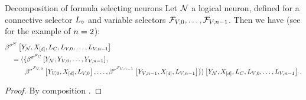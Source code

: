\begin{theorem}{Decomposition of formula selecting neurons}
    \label{the:neuronDecomposition}
    Let $\mathcal{N}$ a logical neuron, defined for a connective selector $L_{\circ}$ and variable selectors $\mathcal{F}_{V,0},\ldots,\mathcal{F}_{V,n-1}$.
    Then we have (see  for the example of $n=2$):
    \begin{align*}
        &\beta^{\sigma^{\mathcal{N}}}\left[Y_{\mathcal{N}},X_{[d]},L_{C},L_{V,0},\ldots,L_{V,n-1}\right] \\
        &\quad = \langle\{\beta^{\sigma^{\mathcal{F}_{C}}}\left[
            Y_{\mathcal{N}},Y_{V,0},\ldots,Y_{V,n-1}\right], \\
        & \quad\quad\quad\beta^{\sigma^{\mathcal{F}_{V,0}}}\left[
            Y_{V,0},X_{[d]},L_{V,0}\right],\ldots,
        \beta^{\sigma^{\mathcal{F}_{V,n-1}}}\left[
            Y_{V,n-1},X_{[d]},L_{V,n-1}\right]
        \} \rangle
        \left[Y_{\mathcal{N}},X_{[d]}, L_{C},L_{V,0},\ldots,L_{V,n-1}\right] \, .
    \end{align*}
\end{theorem}
\begin{proof}
    By composition .
\end{proof}




